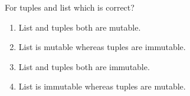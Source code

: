 \question
For tuples and list which is correct?

\begin{enumerate}
\item List and tuples both are mutable.
\item List is mutable whereas tuples are immutable.
\item List and tuples both are immutable.
\item List is immutable whereas tuples are mutable.
\end{enumerate}

